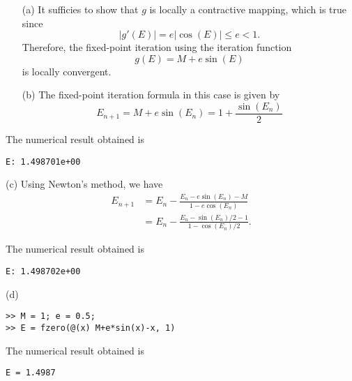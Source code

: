 \begin{sol}
    \begin{multicols}{2}
      \setlength{\columnseprule}{0.2pt}
      \begin{itemize}
      \item[(a)]
        It sufficies to show that $g$ is locally a contractive mapping,
        which is true since
        \begin{displaymath}
          |g'(E)| = e|\cos(E)| \le e < 1.
        \end{displaymath}
        Therefore,
        the fixed-point iteration using the iteration function
        \begin{displaymath}
          g(E) = M + e\sin(E)
        \end{displaymath}
        is locally convergent.

      \item[(b)]
        The fixed-point iteration formula in this case is given by
        \begin{displaymath}
          E_{n+1} = M + e\sin(E_n) = 1 + \frac{\sin(E_n)}{2}
        \end{displaymath}
        
      \end{itemize}
      The numerical result obtained is
\begin{verbatim}
E: 1.498701e+00
\end{verbatim}
    \item[(c)]
      Using Newton's method,
      we have
      \begin{align*}
        E_{n+1} &= E_n - \frac{E_n - e\sin(E_n)-M}{1-e\cos(E_n)} \\
        &= E_n - \frac{E_n-\sin(E_n)/2 -1}{1-\cos(E_n)/2}.
      \end{align*}
      
      The numerical result obtained is
\begin{verbatim}
E: 1.498702e+00
\end{verbatim}

    \item[(d)]
\begin{verbatim}
>> M = 1; e = 0.5;
>> E = fzero(@(x) M+e*sin(x)-x, 1)
\end{verbatim}
      The numerical result obtained is
\begin{verbatim}
E = 1.4987
\end{verbatim}
  \end{multicols}
\end{sol}
